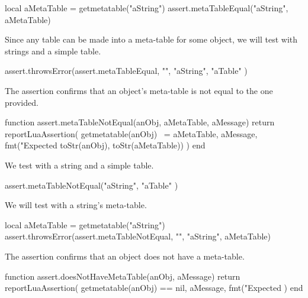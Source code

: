 \startLuaTest
  local aMetaTable = getmetatable("aString")
  assert.metaTableEqual("aString", aMetaTable)
\stopLuaTest
\stopTestCase


Since any table can be made into a meta-table for some object, we will 
test with strings and a simple table. 

\startLuaTest
  assert.throwsError(assert.metaTableEqual, "",
    "aString", { "aTable" })
\stopLuaTest
\stopTestCase

\stopTestSuite


The  assertion confirms that an object's 
meta-table is not equal to the one provided. 

\startLuaCode
function assert.metaTableNotEqual(anObj, aMetaTable, aMessage)
  return reportLuaAssertion(
    getmetatable(anObj) ~= aMetaTable,
    aMessage,
    fmt("Expected %
      toStr(anObj), toStr(aMetaTable))
  )
end
\stopLuaCode


We test with a string and a simple table.

\startLuaTest
  assert.metaTableNotEqual("aString", { "aTable" })
\stopLuaTest
\stopTestCase


We will test with a string's meta-table.

\startLuaTest
  local aMetaTable = getmetatable("aString")
  assert.throwsError(assert.metaTableNotEqual, "",
    "aString", aMetaTable)
\stopLuaTest
\stopTestCase

\stopTestSuite


The  assertion confirms that an object 
does not have a meta-table. 

\startLuaCode
function assert.doesNotHaveMetaTable(anObj, aMessage)
  return reportLuaAssertion(
    getmetatable(anObj) == nil,
    aMessage,
    fmt("Expected %
  )
end
\stopLuaCode


